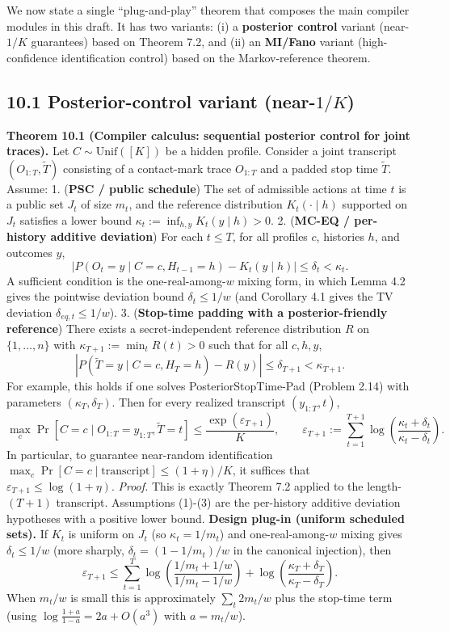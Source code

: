 \documentclass[11pt]{article}
\begin{document}
We now state a single ``plug-and-play'' theorem that composes the main
compiler modules in this draft. It has two variants: (i) a
\textbf{posterior control} variant (near-\(1/K\) guarantees) based on
Theorem 7.2, and (ii) an \textbf{MI/Fano} variant (high-confidence
identification control) based on the Markov-reference theorem.

\hypertarget{posterior-control-variant-near-1k}{%
\subsection{\texorpdfstring{10.1 Posterior-control variant
(near-\(1/K\))}{10.1 Posterior-control variant (near-1/K)}}\label{posterior-control-variant-near-1k}}

\textbf{Theorem 10.1 (Compiler calculus: sequential posterior control
for joint traces).} Let \(C\sim\mathrm{Unif}([K])\) be a hidden profile.
Consider a joint transcript \((O_{1:T},\widetilde T)\) consisting of a
contact-mark trace \(O_{1:T}\) and a padded stop time \(\widetilde T\).
Assume: 1. (\textbf{PSC / public schedule}) The set of admissible
actions at time \(t\) is a public set \(J_t\) of size \(m_t\), and the
reference distribution \(K_t(\cdot\mid h)\) supported on \(J_t\)
satisfies a lower bound \(\kappa_t:= \inf_{h,y} K_t(y\mid h) > 0\). 2.
(\textbf{MC-EQ / per-history additive deviation}) For each \(t\le T\),
for all profiles \(c\), histories \(h\), and outcomes \(y\), \[
|P(O_t=y\mid C=c,H_{t-1}=h) - K_t(y\mid h)| \le \delta_t < \kappa_t.
\] A sufficient condition is the one-real-among-\(w\) mixing form, in
which Lemma 4.2 gives the pointwise deviation bound \(\delta_t\le 1/w\)
(and Corollary 4.1 gives the TV deviation \(\delta_{eq,t}\le 1/w\)). 3.
(\textbf{Stop-time padding with a posterior-friendly reference}) There
exists a secret-independent reference distribution \(R\) on
\(\{1,\dots,n\}\) with \(\kappa_{T+1}:=\min_t R(t)>0\) such that for all
\(c,h,y\), \[
|P(\widetilde T=y\mid C=c,H_T=h)-R(y)|\le \delta_{T+1} < \kappa_{T+1}.
\] For example, this holds if one solves PosteriorStopTime-Pad (Problem
2.14) with parameters \((\kappa_T,\delta_T)\). Then for every realized
transcript \((y_{1:T},t)\), \[
\max_{c} \Pr[C=c\mid O_{1:T}=y_{1:T},\widetilde T=t] \le \frac{\exp(\varepsilon_{T+1})}{K},
\qquad
\varepsilon_{T+1}:= \sum_{t=1}^{T+1} \log\!\left(\frac{\kappa_t+\delta_t}{\kappa_t-\delta_t}\right).
\] In particular, to guarantee near-random identification
\(\max_c \Pr[C=c\mid \text{transcript}]\le (1+\eta)/K\), it suffices
that \(\varepsilon_{T+1}\le \log(1+\eta)\). \emph{Proof.} This is
exactly Theorem 7.2 applied to the length-\((T{+}1)\) transcript.
Assumptions (1)-(3) are the per-history additive deviation hypotheses
with a positive lower bound. \textbf{Design plug-in (uniform scheduled
sets).} If \(K_t\) is uniform on \(J_t\) (so \(\kappa_t=1/m_t\)) and
one-real-among-\(w\) mixing gives \(\delta_t\le 1/w\) (more sharply,
\(\delta_t=(1-1/m_t)/w\) in the canonical injection), then \[
\varepsilon_{T+1}\le \sum_{t=1}^T \log\!\left(\frac{1/m_t+1/w}{1/m_t-1/w}\right) + \log\!\left(\frac{\kappa_T+\delta_T}{\kappa_T-\delta_T}\right).
\] When \(m_t/w\) is small this is approximately \(\sum_t 2m_t/w\) plus
the stop-time term (using \(\log\frac{1+a}{1-a}=2a+O(a^3)\) with
\(a=m_t/w\)).
\end{document}
